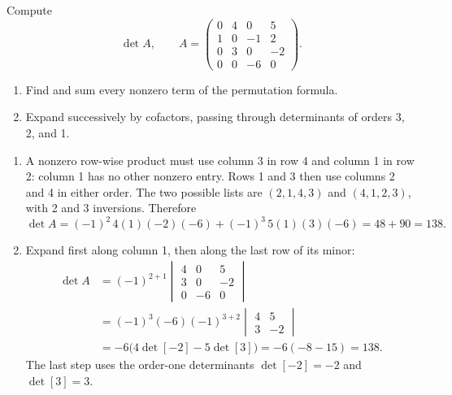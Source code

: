 \begin{problem}\label{ex:05:sparse}
Compute
\[
\det A,\qquad
A=\begin{pmatrix}0&4&0&5\\1&0&-1&2\\0&3&0&-2\\0&0&-6&0\end{pmatrix}.
\]
\begin{enumerate}
\item Find and sum every nonzero term of the permutation formula.
\item Expand successively by cofactors, passing through determinants of
orders 3, 2, and 1.
\end{enumerate}
\end{problem}
\begin{solution}
\begin{enumerate}
\item A nonzero row-wise product must use column 3 in row 4 and column 1
in row 2: column 1 has no other nonzero entry. Rows 1 and 3 then use
columns 2 and 4 in either order. The two possible lists are
\((2,1,4,3)\) and \((4,1,2,3)\), with 2 and 3 inversions. Therefore
\[
\det A=(-1)^2\,4(1)(-2)(-6)+(-1)^3\,5(1)(3)(-6)=48+90=138.
\]
\item Expand first along column 1, then along the last row of its minor:
\[
\begin{aligned}
\det A
&=(-1)^{2+1}\begin{vmatrix}4&0&5\\3&0&-2\\0&-6&0\end{vmatrix}\\
&=(-1)^3(-6)(-1)^{3+2}\begin{vmatrix}4&5\\3&-2\end{vmatrix}\\
&=-6\bigl(4\det[-2]-5\det[3]\bigr)
=-6(-8-15)=138.
\end{aligned}
\]
The last step uses the order-one determinants \(\det[-2]=-2\) and \(\det[3]=3\).
\end{enumerate}
\end{solution}

